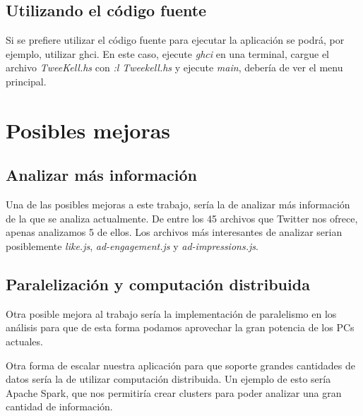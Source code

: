 \documentclass[11pt]{article}
\begin{document}
\subsection{Utilizando el código fuente}
Si se prefiere utilizar el código fuente para ejecutar la aplicación se podrá, por ejemplo, utilizar ghci. En este caso, ejecute \textit{ghci} en una terminal, cargue el archivo \textit{TweeKell.hs} con \textit{:l Tweekell.hs} y ejecute \textit{main}, debería de ver el menu principal.


\section{Posibles mejoras}
\subsection{Analizar más información}

Una de las posibles mejoras a este trabajo, sería la de analizar más información de la que se analiza actualmente. De entre los 45 archivos que Twitter nos ofrece, apenas analizamos 5 de ellos.
Los archivos más interesantes de analizar serian posiblemente \textit{like.js}, \textit{ad-engagement.js} y \textit{ad-impressions.js}.

\subsection{Paralelización y computación distribuida}
Otra posible mejora al trabajo sería la implementación de paralelismo en los análisis para que de esta forma podamos aprovechar la gran potencia de los PCs actuales. 

Otra forma de escalar nuestra aplicación para que soporte grandes cantidades de datos sería la de utilizar computación distribuida. Un ejemplo de esto sería Apache Spark\cite{spark}, que nos permitiría crear clusters para poder analizar una gran cantidad de información.
\end{document}
